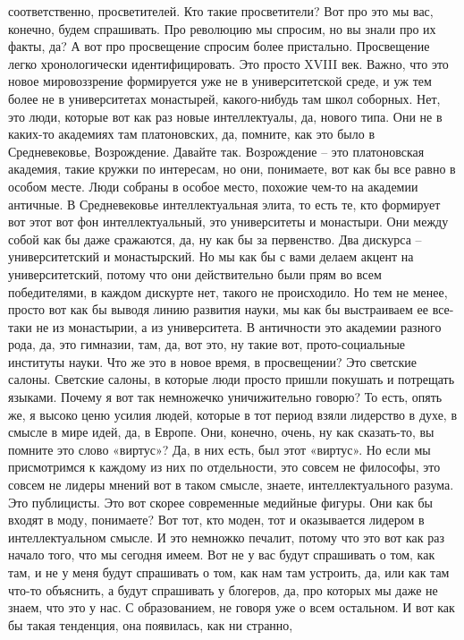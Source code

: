 соответственно, просветителей. Кто такие просветители? Вот про это мы вас,
конечно, будем спрашивать. Про революцию мы спросим, но вы знали про их факты,
да? А вот про просвещение спросим более пристально. Просвещение легко
хронологически идентифицировать. Это просто XVIII век. Важно, что это новое
мировоззрение формируется уже не в университетской среде, и уж тем более не в
университетах монастырей, какого-нибудь там школ соборных. Нет, это люди,
которые вот как раз новые интеллектуалы, да, нового типа. Они не в каких-то
академиях там платоновских, да, помните, как это было в Средневековье,
Возрождение. Давайте так. Возрождение – это платоновская академия, такие кружки
по интересам, но они, понимаете, вот как бы все равно в особом месте. Люди
собраны в особое место, похожие чем-то на академии античные. В Средневековье
интеллектуальная элита, то есть те, кто формирует вот этот вот фон
интеллектуальный, это университеты и монастыри. Они между собой как бы даже
сражаются, да, ну как бы за первенство. Два дискурса – университетский и
монастырский. Но мы как бы с вами делаем акцент на университетский, потому что
они действительно были прям во всем победителями, в каждом дискурте нет, такого
не происходило. Но тем не менее, просто вот как бы выводя линию развития науки,
мы как бы выстраиваем ее все-таки не из монастырии, а из университета. В
античности это академии разного рода, да, это гимназии, там, да, вот это, ну
такие вот, прото-социальные институты науки. Что же это в новое время, в
просвещении? Это светские салоны. Светские салоны, в которые люди просто пришли
покушать и потрещать языками. Почему я вот так немножечко уничижительно говорю?
То есть, опять же, я высоко ценю усилия людей, которые в тот период взяли
лидерство в духе, в смысле в мире идей, да, в Европе. Они, конечно, очень, ну
как сказать-то, вы помните это слово «виртус»? Да, в них есть, был этот
«виртус». Но если мы присмотримся к каждому из них по отдельности, это совсем не
философы, это совсем не лидеры мнений вот в таком смысле, знаете,
интеллектуального разума. Это публицисты. Это вот скорее современные медийные
фигуры. Они как бы входят в моду, понимаете? Вот тот, кто моден, тот и
оказывается лидером в интеллектуальном смысле. И это немножко печалит, потому
что это вот как раз начало того, что мы сегодня имеем. Вот не у вас будут
спрашивать о том, как там, и не у меня будут спрашивать о том, как нам там
устроить, да, или как там что-то объяснить, а будут спрашивать у блогеров, да,
про которых мы даже не знаем, что это у нас. С образованием, не говоря уже о
всем остальном. И вот как бы такая тенденция, она появилась, как ни странно,
